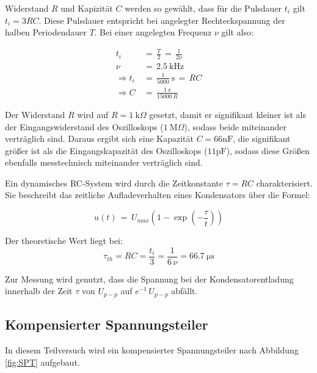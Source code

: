 \documentclass[10pt,a4paper]{scrartcl}
\begin{document}
Widerstand $R$ und Kapizität $C$ werden so gewählt,
dass für die Pulsdauer $t_i$ gilt $t_i = 3RC$.
Diese Pulsdauer entspricht bei angelegter Rechteckspannung der halben
Periodendauer $T$.
Bei einer angelegten Frequenz $\nu$ gilt also:

\begin{align*}
    t_i \,&=\, \frac{T}{2} \,=\,\frac{1}{2\nu}\\
    \nu\,&=\,2.5~\mathrm{kHz}\\
    \Rightarrow t_i\,&=\,\frac{1}{5000}~\mathrm{s}\,=\,RC\\
    \Rightarrow C\,&=\,\frac{1~\mathrm{s}}{15000\,R}
\end{align*}

Der Widerstand $R$ wird auf $R=1~ \mathrm k\Omega$ gesetzt,
damit er signifikant kleiner ist als der Eingangswiderstand des Oszilloskops
($1~\mathrm M\Omega$), sodass beide miteinander verträglich sind.
Daraus ergibt sich eine Kapazität $C=66\mathrm{nF}$,
die signifikant größer ist als die Eingangskapazität des Oszilloskops
($11\mathrm{pF}$), sodass diese Größen ebenfalls messtechnisch miteinander
verträglich sind.

Ein dynamisches RC-System wird durch die Zeitkonstante $\tau=RC$
charakterisiert.
Sie beschreibt das zeitliche Aufladeverhalten eines Kondensators über die
Formel:

\begin{equation}
    u(t) \,=\, U_{max} \left(1-\exp\left(-\frac{\tau}{t}\right)\right)
\end{equation}

Der theoretische Wert liegt bei:
\begin{equation}
    \tau_{th} = R C = \frac{t_i}{3} = \frac{1}{6\,\nu} = 66.7~\mathrm{\mu s}
\end{equation}

Zur Messung wird genutzt, dass die Spannung bei der Kondensatorentladung
innerhalb der Zeit $\tau$ von $U_{p-p}$ auf $e^{-1}\, U_{p-p}$ abfällt.

\subsection {Kompensierter Spannungsteiler}

In diesem Teilversuch wird ein kompensierter Spannungsteiler nach Abbildung
\ref{fig:SPT} aufgebaut.
\end{document}
